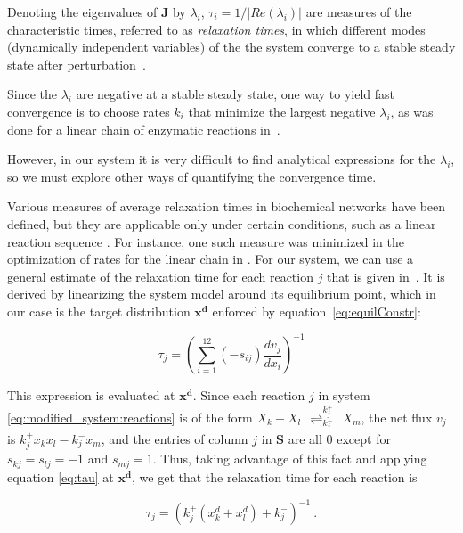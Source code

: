 		Denoting the eigenvalues of $\mathbf{J}$ by $\lambda_i$, $\tau_i =
		1/|Re(\lambda_i)|$ are measures of the characteristic times,
		referred to as {\it relaxation times}, in which different modes
		(dynamically independent variables) of the the system converge to a
		stable steady state after perturbation~\cite{bib:Heinrich1977, bib:Jamshidi2008}.
		
		Since the $\lambda_i$ are negative at a	stable steady state, one way to yield fast convergence is to choose
		rates $k_i$ that minimize the largest negative $\lambda_i$, as was done for a
		linear chain of enzymatic reactions in~\cite{Schuster:1987p11838}.
		
		However, in our system it is very difficult to find analytical
		expressions for the $\lambda_i$, so we must explore other ways of
		quantifying the convergence time.

		Various measures of average relaxation times in biochemical networks
		have been defined, but they are applicable only under certain
		conditions, such as a linear reaction sequence
		\cite{bib:Heinrich1991}.  For instance, one such measure was
		minimized in the optimization of rates for the linear chain in
		\cite{Schuster:1987p11838}.  For our system, we can use a general
		estimate of the relaxation time for each reaction $j$ that is given
		in~\cite{bib:Heinrich1996}.  It is derived by linearizing the system
		model around its equilibrium point, which in our case is the target
		distribution $\mathbf{x^d}$ enforced by equation~\eqref{eq:equilConstr}:

		\begin{equation}
		\tau_j = \left( \sum_{i=1}^{12} (-s_{ij}) \frac{d v_j}{d x_i}
		\right)^{-1} \label{eq:tau}
		\end{equation}

		This expression is evaluated at $\mathbf{x^d}$. Since each reaction	$j$ in system \eqref{eq:modified_system:reactions} is of
		the form $X_k + X_l
		~~{\mathop{\rightleftharpoons}_{k_j^-}^{k_j^+}}~~ X_m$, the net flux
		$v_j$ is $k_j^+ x_k x_l - k_j^- x_m$, and the entries of column $j$
		in $\mathbf{S}$ are all $0$ except for $s_{kj} = s_{lj} = -1$ and
		$s_{mj} = 1$. Thus, taking advantage of this fact and applying equation \eqref{eq:tau} at $\mathbf{x^d}$, we get that the
		relaxation time for each reaction is

		\begin{equation}
			\tau_j = (k_j^+(x_k^d + x_l^d) + k_j^-)^{-1}~. \label{eq:tauSys}
		\end{equation}
		
